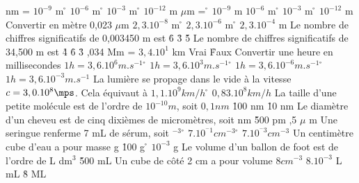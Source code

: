  nm =
\rv
$10^{-9}$ m
\r
$10^{-6}$ m
\r
$10^{-3}$ m
\r
$10^{-12}$ m
 $\mu$m =
\r
$10^{-9}$ m
\rv
$10^{-6}$ m
\r
$10^{-3}$ m
\r
$10^{-12}$ m
\q
Convertir en mètre 0,023 $\mu$m
\rv
$2,3. 10^{-8}$ m
\r
$2,3. 10^{-6}$ m
\r
$2,3. 10^{-4}$ m
\q
Le nombre de chiffres significatifs de 0,003450 m est
\r
6
\r
3
\r
5
\q
Le nombre de chiffres significatifs de 34,500 m est
\r
4
\r
6
\r
3
,034 Mm = $3,4.10^1$ km
\rv
Vrai
\r
Faux
\q
Convertir une heure en millisecondes
\rv
$1 h = 3,6.10^6 m.s^{-1}$
\r
$1 h = 3,6.10^3 m.s^{-1}$
\r
$1 h = 3,6.10^{-6} m.s^{-1}$
\r
$1 h = 3,6.10^{-3} m.s^{-1}$
\q
La lumière se propage dans le vide à  la vitesse $c=3,0.10^8\mps$.
Cela équivaut à  
\rv
$1,1.10^9 km/h$
\r
$0,83.10^8 km/h$
\q
La taille d'une petite molécule	est de l'ordre de $10^{-10} m$, soit
\rv
$0,1 nm$
\r
100 nm
\r
10 nm	
\q
Le diamètre d'un cheveu	est de cinq dixièmes de micromètres, soit
 nm
\r
500 pm
,5 $\mu$ m
\q 
Une seringue renferme 7 mL de sérum, soit
 $^{-3}$
\r
$7.10^{^-1}cm^{-3}$
\r
$7.10^{^-3}cm^{-3}$
\q
Un centimètre cube d'eau a pour masse
 g
\r
100 g
\r
$10^{-3}$ g
\q
Le volume d'un ballon de foot est de l'ordre de 
 L
 dm$^{3}$
\r
500 mL
\q
Un cube de côté 2 cm a pour volume
\rv
$8 cm^{-3}$
\rv
$8.10^{-3}$ L 
 mL
\r
8 ML
